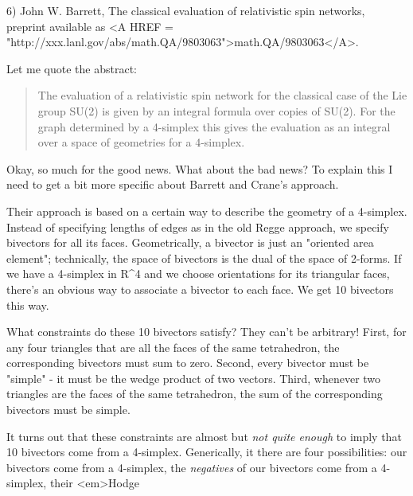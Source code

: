 6) John W. Barrett, The classical evaluation of relativistic spin
networks, preprint available as <A HREF = "http://xxx.lanl.gov/abs/math.QA/9803063">math.QA/9803063</A>.


Let me quote the abstract:

\begin{quote}

     The evaluation of a relativistic spin network for the classical
     case of the Lie group SU(2) is given by an integral formula over
     copies of SU(2).  For the graph determined by a 4-simplex this
     gives the evaluation as an integral over a space of geometries
     for a 4-simplex.

\end{quote}

Okay, so much for the good news.  What about the bad news?  To explain
this I need to get a bit more specific about Barrett
and Crane's approach.  

Their approach is based on a certain way to describe the geometry of a
4-simplex.  Instead of specifying lengths of edges as in the old Regge
approach, we specify bivectors for all its faces.  Geometrically, a
bivector is just an "oriented area element"; technically, the space of
bivectors is the dual of the space of 2-forms.  If we have a 4-simplex
in R^{4} and we choose orientations for its triangular faces, there's an
obvious way to associate a bivector to each face.  We get 10 bivectors
this way.

What constraints do these 10 bivectors satisfy?  They can't be
arbitrary!  First, for any four triangles that are all the faces of
the same tetrahedron, the corresponding bivectors must sum to zero.
Second, every bivector must be "simple" - it must be the wedge
product of two vectors.  Third, whenever two triangles are the faces
of the same tetrahedron, the sum of the corresponding bivectors must
be simple.

It turns out that these constraints are almost but \emph{not quite enough}
to imply that 10 bivectors come from a 4-simplex.  Generically, it
there are four possibilities: our bivectors come from a 4-simplex, 
the \emph{negatives} of our bivectors come from a 4-simplex, their <em>Hodge 


